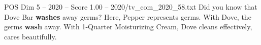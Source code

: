 \begin{textsample}{POS Dim 5 – 2020 – Score 1.00 – 2020/tv\_com\_2020\_58.txt}  \label{ex:f5_pos_040}
Did you know that Dove Bar \textbf{washes} away germs?
Here, Pepper represents germs.
With Dove, the germs \textbf{wash} away.
With 1-Quarter Moisturizing Cream, Dove cleans effectively, cares beautifully.

\end{textsample}
